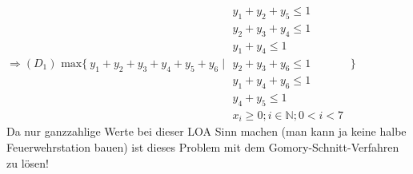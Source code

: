 \documentclass[a4paper,10pt]{article}
\begin{document}
	$ \Longrightarrow (D_1) \text{ max} \{\ y_1+y_2+y_3+y_4+y_5+y_6 \mid 
	\begin{matrix}
		y_1 + y_2 + y_5 \leq 1\\
		y_2 + y_3 + y_4 \leq 1\\
		y_1 + y_4 \leq 1\\
		y_2 + y_3 + y_6 \leq 1\\
		y_1 + y_4 + y_6 \leq 1\\
		y_4 + y_5 \leq 1 \\
		x_i \geq 0; i\in \mathbb{N}; 0<i<7
	\end{matrix}
	\ \}$\\
	
	Da nur ganzzahlige Werte bei dieser LOA Sinn machen (man kann ja keine halbe Feuerwehrstation bauen) ist dieses Problem mit dem Gomory-Schnitt-Verfahren zu lösen!
\end{document}
